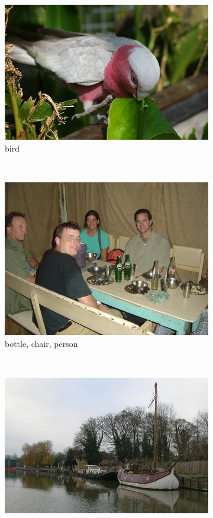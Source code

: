 \begin{figure}[bt]
\begin{subfigure}[b]{0.18\textwidth}
        \includegraphics[width=\textwidth]{000040}
        \caption{\scriptsize bird}
        \label{fig:voc11}
    \end{subfigure}
    ~
    \begin{subfigure}[b]{0.18\textwidth}
        \centering
        \includegraphics[width=\textwidth]{000050}
        \caption{\scriptsize bottle, chair, person}
        \label{fig:voc12}
    \end{subfigure}
    ~
    \begin{subfigure}[b]{0.18\textwidth}
        \centering
        \includegraphics[width=\textwidth]{000061}

\end{subfigure}
\end{figure}
